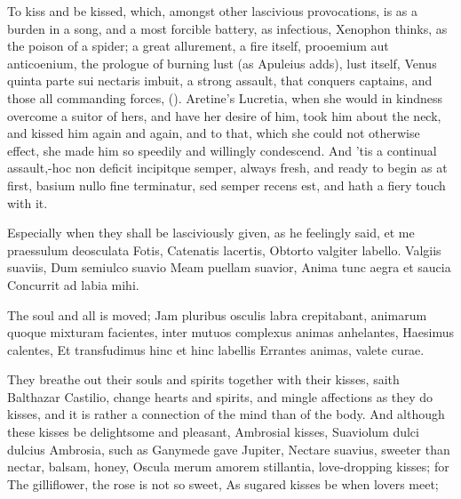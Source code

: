 {To kiss and be kissed, which, amongst other lascivious provocations, is
as a burden in a song, and a most forcible battery, as infectious,
 Xenophon thinks, as the poison of a spider; a great allurement,
a fire itself, prooemium aut anticoenium, the prologue of burning lust
(as Apuleius adds), lust itself, Venus quinta parte sui nectaris
imbuit, a strong assault, that conquers captains, and those all
commanding forces, ().
Aretine's Lucretia, when she would in kindness overcome a suitor
of hers, and have her desire of him, took him about the neck, and
kissed him again and again, and to that, which she could not otherwise
effect, she made him so speedily and willingly condescend. And 'tis a
continual assault,-hoc non deficit incipitque semper, always
fresh, and ready to begin as at first, basium nullo fine
terminatur, sed semper recens est, and hath a fiery touch with it.

Especially when they shall be lasciviously given, as he feelingly said,
et me praessulum deosculata Fotis, Catenatis lacertis, 
Obtorto valgiter labello.
Valgiis suaviis,
Dum semiulco suavio
Meam puellam suavior,
Anima tunc aegra et saucia
Concurrit ad labia mihi.

The soul and all is moved; Jam pluribus osculis labra
crepitabant, animarum quoque mixturam facientes, inter mutuos complexus
animas anhelantes,
Haesimus calentes,
Et transfudimus hinc et hinc labellis
Errantes animas, valete curae.

They breathe out their souls and spirits together with their kisses,
saith Balthazar Castilio, change hearts and spirits, and mingle
affections as they do kisses, and it is rather a connection of the mind
than of the body. And although these kisses be delightsome and
pleasant, Ambrosial kisses, Suaviolum dulci dulcius Ambrosia,
such as  Ganymede gave Jupiter, Nectare suavius, sweeter than
nectar, balsam, honey, Oscula merum amorem stillantia,
love-dropping kisses; for
The gilliflower, the rose is not so sweet,
As sugared kisses be when lovers meet;

}
